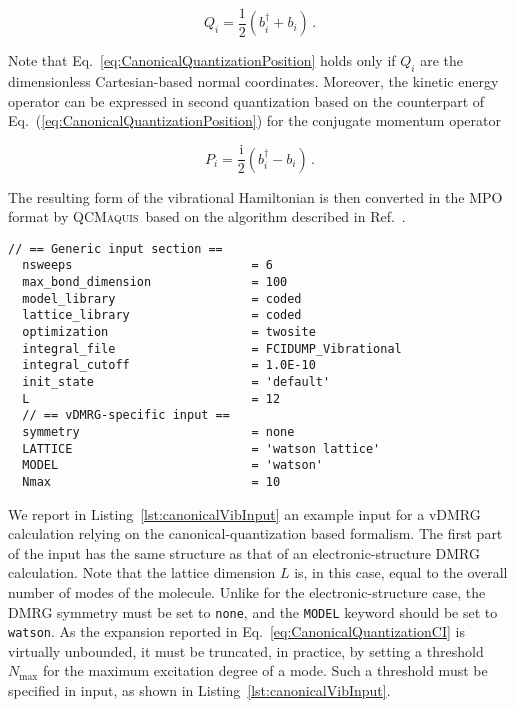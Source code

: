 \documentclass[bibliography=totoc,12pt,a4paper]{scrartcl}
\newcommand{\qcm}{\textsc{QCMaquis}}
\begin{document}
\begin{equation}
  Q_i = \frac{1}{2} \left( b_i^\dagger + b_i \right) \, .
  \label{eq:CanonicalQuantizationPosition}
\end{equation}

Note that Eq.~\ref{eq:CanonicalQuantizationPosition} holds only if $Q_i$ are the dimensionless Cartesian-based normal coordinates.
Moreover, the kinetic energy operator can be expressed in second quantization based on the counterpart of Eq.~(\ref{eq:CanonicalQuantizationPosition}) for the conjugate momentum operator

\begin{equation}
  P_i = \frac{\mathrm{i}}{2} \left( b_i^\dagger - b_i \right) \, .
  \label{eq:CanonicalQuantizationMomentum}
\end{equation}

The resulting form of the vibrational Hamiltonian is then converted in the MPO format by \qcm\ based on the algorithm described in Ref.~. \\

\begin{lstlisting}[language=qcmaquis,
				   caption={Input example for a canonicalq quantization vDMRG-FCI calculation},
				   label=lst:canonicalVibInput]
  // == Generic input section ==
  nsweeps                         = 6
  max_bond_dimension              = 100
  model_library                   = coded
  lattice_library                 = coded
  optimization                    = twosite 
  integral_file                   = FCIDUMP_Vibrational
  integral_cutoff                 = 1.0E-10
  init_state                      = 'default'
  L                               = 12
  // == vDMRG-specific input ==
  symmetry                        = none
  LATTICE                         = 'watson lattice'
  MODEL                           = 'watson'
  Nmax                            = 10
\end{lstlisting}

We report in Listing~\ref{lst:canonicalVibInput} an example input for a vDMRG calculation relying on the canonical-quantization based formalism.
The first part of the input has the same structure as that of an electronic-structure DMRG calculation.
Note that the lattice dimension $L$ is, in this case, equal to the overall number of modes of the molecule.
Unlike for the electronic-structure case, the DMRG symmetry must be set to \texttt{none}, and the \texttt{MODEL} keyword should be set to \texttt{watson}.
As the expansion reported in Eq.~\ref{eq:CanonicalQuantizationCI} is virtually unbounded, it must be truncated, in practice, by setting a threshold $N_\text{max}$ for the maximum excitation degree of a mode.
Such a threshold must be specified in input, as shown in Listing~\ref{lst:canonicalVibInput}.
\end{document}
